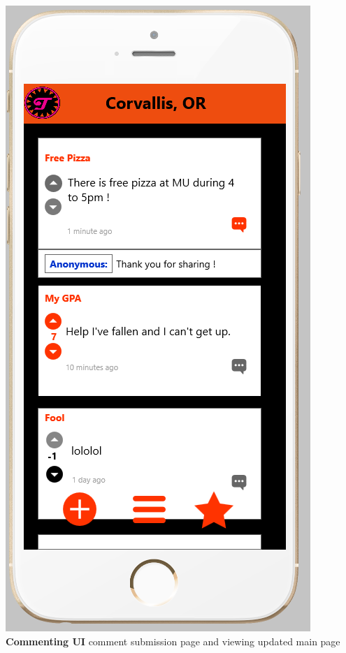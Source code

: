\documentclass[12pt]{article}
\begin{document}
\begin{center}
\includegraphics[scale=0.228]{img/ui/commentUpdate}\linebreak
\textbf{Commenting UI}\linebreak
comment submission page and viewing updated main page
  \end{center}
\end{document}

